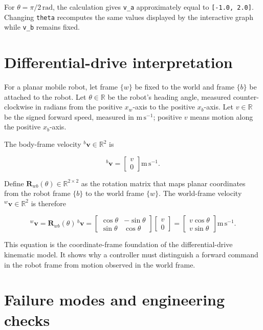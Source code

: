 \documentclass[
  australian,
  12pt,
  letterpaper,
  DIV=11,
  numbers=noendperiod,
  twoside]{scrreprt}
\begin{document}
For \(\theta=\pi/2\,\mathrm{rad}\), the calculation gives \texttt{v\_a}
approximately equal to \texttt{{[}-1.0,\ 2.0{]}}. Changing
\texttt{theta} recomputes the same values displayed by the interactive
graph while \texttt{v\_b} remains fixed.

\section{Differential-drive
interpretation}\label{differential-drive-interpretation}

For a planar mobile robot, let frame \(\{w\}\) be fixed to the world and
frame \(\{b\}\) be attached to the robot. Let \(\theta\in\mathbb R\) be
the robot's heading angle, measured counter-clockwise in radians from
the positive \(x_w\)-axis to the positive \(x_b\)-axis. Let
\(v\in\mathbb R\) be the signed forward speed, measured in
\(\mathrm{m\,s^{-1}}\); positive \(v\) means motion along the positive
\(x_b\)-axis.

The body-frame velocity \({}^{b}\mathbf v\in\mathbb R^2\) is

\[
{}^{b}\mathbf{v}
=
\begin{bmatrix}
v\\
0
\end{bmatrix}
\mathrm{m\,s^{-1}}.
\]

Define \(\mathbf R_{wb}(\theta)\in\mathbb R^{2\times2}\) as the rotation
matrix that maps planar coordinates from the robot frame \(\{b\}\) to
the world frame \(\{w\}\). The world-frame velocity
\({}^{w}\mathbf v\in\mathbb R^2\) is therefore

\[
{}^{w}\mathbf{v}
=
\mathbf{R}_{wb}(\theta)\,{}^{b}\mathbf{v}
=
\begin{bmatrix}
\cos\theta & -\sin\theta\\
\sin\theta & \cos\theta
\end{bmatrix}
\begin{bmatrix}
v\\
0
\end{bmatrix}
=
\begin{bmatrix}
v\cos\theta\\
v\sin\theta
\end{bmatrix}
\mathrm{m\,s^{-1}}.
\]

This equation is the coordinate-frame foundation of the
differential-drive kinematic model. It shows why a controller must
distinguish a forward command in the robot frame from motion observed in
the world frame.

\section{Failure modes and engineering
checks}\label{failure-modes-and-engineering-checks}
\end{document}
